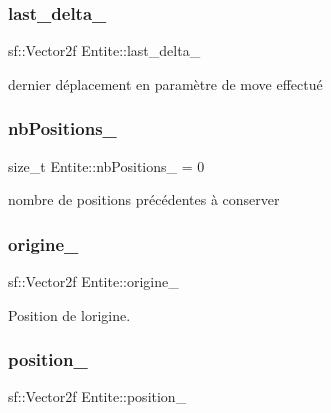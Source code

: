 \subsubsection{\texorpdfstring{last\+\_\+delta\+\_\+}{last\_delta\_}}
{\footnotesize\ttfamily sf\+::\+Vector2f Entite\+::last\+\_\+delta\+\_\+\hspace{0.3cm}{\ttfamily [protected]}}



dernier déplacement en paramètre de move effectué 

\mbox{\label{class_entite_a737d76cd7a3de46a5d72231ef974f8d1}} 
\subsubsection{\texorpdfstring{nb\+Positions\+\_\+}{nbPositions\_}}
{\footnotesize\ttfamily size\+\_\+t Entite\+::nb\+Positions\+\_\+ = 0\hspace{0.3cm}{\ttfamily [protected]}}



nombre de positions précédentes à conserver 

\mbox{\label{class_entite_ac3986b76d5eb35e9c9ec1f51bf516987}} 
\subsubsection{\texorpdfstring{origine\+\_\+}{origine\_}}
{\footnotesize\ttfamily sf\+::\+Vector2f Entite\+::origine\+\_\+\hspace{0.3cm}{\ttfamily [protected]}}



Position de l\textquotesingle{}origine. 

\mbox{\label{class_entite_abbd554c4f122159a73cb113cc8de3860}} 
\subsubsection{\texorpdfstring{position\+\_\+}{position\_}}
{\footnotesize\ttfamily sf\+::\+Vector2f Entite\+::position\+\_\+\hspace{0.3cm}{\ttfamily [protected]}}




